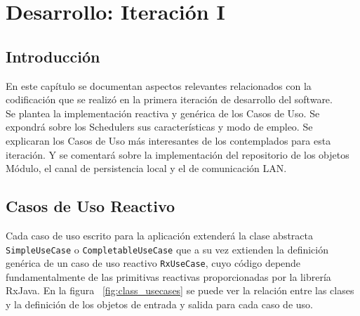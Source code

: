 
\chapter{Desarrollo: Iteración I} %

\label{Chapter6} %


\section{Introducción}

En este capítulo se documentan aspectos relevantes relacionados con la codificación que se realizó en la primera iteración de desarrollo del software.\\
Se plantea la implementación reactiva y genérica de los Casos de Uso. Se expondrá sobre los Schedulers sus características y modo de empleo.
Se explicaran los Casos de Uso más interesantes de los contemplados para esta iteración.
Y se comentará sobre la implementación del repositorio de los objetos Módulo, el canal de persistencia local y el de comunicación LAN.

\section{Casos de Uso Reactivo}
Cada caso de uso escrito para la aplicación extenderá la clase abstracta \texttt{SimpleUseCase} o \texttt{CompletableUseCase} que a su vez extienden la definición genérica de un caso de uso reactivo \texttt{RxUseCase}, cuyo código depende fundamentalmente de las primitivas reactivas proporcionadas por la librería RxJava.
En la figura ~\ref{fig:class_usecases} se puede ver la relación entre las clases y la definición de los objetos de entrada y salida para cada caso de uso.

